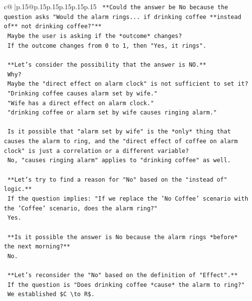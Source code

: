 \documentclass{article}
\begin{document}
{\begin{supertabular}{c@{$\;$}|p{.15\linewidth}@{}p{.15\linewidth}p{.15\linewidth}p{.15\linewidth}p{.15\linewidth}p{.15\linewidth}}
{{{\texttt{        **Could the answer be No because the question asks "Would the alarm rings... if drinking coffee **instead of** not drinking coffee?"**} \\
\texttt{        Maybe the user is asking if the *outcome* changes?} \\
\texttt{        If the outcome changes from 0 to 1, then "Yes, it rings".} \\
\\ 
\texttt{        **Let's consider the possibility that the answer is NO.**} \\
\texttt{        Why?} \\
\texttt{        Maybe the "direct effect on alarm clock" is not sufficient to set it?} \\
\texttt{        "Drinking coffee causes alarm set by wife."} \\
\texttt{        "Wife has a direct effect on alarm clock."} \\
\texttt{        "drinking coffee or alarm set by wife causes ringing alarm."} \\
\\ 
\texttt{        Is it possible that "alarm set by wife" is the *only* thing that causes the alarm to ring, and the "direct effect of coffee on alarm clock" is just a correlation or a different variable?} \\
\texttt{        No, "causes ringing alarm" applies to "drinking coffee" as well.} \\
\\ 
\texttt{        **Let's try to find a reason for "No" based on the "instead of" logic.**} \\
\texttt{        If the question implies: "If we replace the 'No Coffee' scenario with the 'Coffee' scenario, does the alarm ring?"} \\
\texttt{        Yes.} \\
\\ 
\texttt{        **Is it possible the answer is No because the alarm rings *before* the next morning?**} \\
\texttt{        No.} \\
\\ 
\texttt{        **Let's reconsider the "No" based on the definition of "Effect".**} \\
\texttt{        If the question is "Does drinking coffee *cause* the alarm to ring?"} \\
\texttt{        We established \$C \textbackslash{}to R\$.} \\
}}}
\end{supertabular}}
\end{document}
